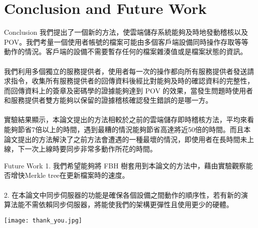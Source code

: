 \section{Conclusion and Future Work}

\begin{frame}{Conclusion}
	我們提出了一個新的方法，使雲端儲存系統能夠及時地發動稽核以及POV。我們考量一個使用者帳號的檔案可能由多個客戶端設備同時操作存取等等動作的情況。客戶端的設備不需要暫存任何的檔案雜湊值或是檔案狀態的資訊。
    ~\\
    ~\\
	我們利用多個獨立的服務提供者，使用者每一次的操作都向所有服務提供者發送請求指令，收集所有服務提供者的回傳資料後經比對能夠及時的確認資料的完整性，而回傳資料上的簽章及密碼學的證據能夠達到 POV 的效果，當發生問題時使用者和服務提供者雙方能夠以保留的證據稽核確認發生錯誤的是哪一方。
    ~\\
    ~\\
    實驗結果顯示，本論文提出的方法相較於之前的雲端儲存即時稽核方法，平均來看能夠節省7倍以上的時間，遇到最糟的情況能夠節省高達將近50倍的時間。而且本論文提出的方法解決了之前方法會遭遇的一種最壞的情況，即使用者在長時間未上線，下一次上線時要同步非常多動作所花的時間。
\end{frame}

\begin{frame}{Future Work}
	1. 我們希望能夠將 FBH 樹套用到本論文的方法中，藉由實驗觀察能否增快Merkle tree在更新檔案時的速度。
    ~\\
    ~\\
    2. 在本論文中同步伺服器的功能是確保各個設備之間動作的順序性，若有新的演算法能不需依賴同步伺服器，將能使我們的架構更彈性且使用更少的硬體。
\end{frame}

\begin{frame}
	\begin{center}
		\texttt{[image: thank\_you.jpg]}
	\end{center}	
\end{frame}
